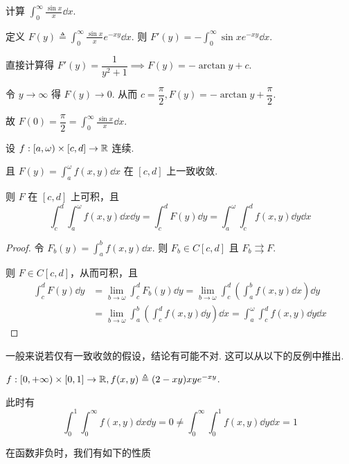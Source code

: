 \begin{example}
    计算 $\displaystyle\int_0^\infty\frac{\sin x}{x}\dd x$.

    定义 $F(y)\triangleq\displaystyle\int_0^\infty\frac{\sin x}{x}e^{-xy}\dd x$. 则 $F'(y)=-\displaystyle\int_0^\infty \sin x e^{-xy}\dd x$.

    直接计算得 $F'(y)=\dfrac{1}{y^2+1}\implies F(y)=-\arctan y+c$.

    令 $y\to\infty$ 得 $F(y)\to 0$. 从而 $c=\dfrac{\pi}{2},F(y)=-\arctan y+\dfrac{\pi}{2}$.

    故 $F(0)=\dfrac{\pi}{2}=\displaystyle\int_0^\infty\frac{\sin x}{x}\dd x$.
\end{example}


\begin{property}
    设 $f:[a,\omega)\times [c,d]\to\mathbb{R}$ 连续.

    且 $F(y)=\displaystyle\int_a^\omega f(x,y)\dd x$ 在 $[c,d]$ 上一致收敛.

    则 $F$ 在 $[c,d]$ 上可积，且
$$
\int_c^d\int_a^\omega f(x,y)\dd x\dd y=\int_c^dF(y)\dd y=\int_a^\omega\int_c^d f(x,y)\dd y\dd x
$$
\end{property}
\begin{proof}
    令 $F_b(y)=\displaystyle\int_a^bf(x,y)\dd x$. 则 $F_b\in C[c,d]$ 且 $F_b\rightrightarrows F$.

    则 $F\in C[c,d]$，从而可积，且
$$
\begin{aligned}
    \int_c^dF(y)\dd y&=\lim_{b\to\omega}\int_c^d F_b(y)\dd y=\lim_{b\to\omega}\int_c^d\left(\int_a^b f(x,y)\dd x\right)\dd y\\
    &=\lim_{b\to\omega}\int_a^b\left(\int_c^df(x,y)\dd y\right)\dd x=\int_a^\omega\int_c^d f(x,y)\dd y\dd x
\end{aligned}
$$
\end{proof}

\begin{hint}
    一般来说若仅有一致收敛的假设，结论有可能不对. 这可以从以下的反例中推出.
\end{hint}

\begin{example}
    $f:[0,+\infty)\times [0,1]\to\mathbb{R},f(x,y)\triangleq(2-xy)xye^{-xy}$.

    此时有
$$
\int_0^1\int_0^\infty f(x,y)\dd x\dd y=0\ne\int_0^\infty\int_0^1f(x,y)\dd y\dd x=1
$$
\end{example}

在函数非负时，我们有如下的性质

